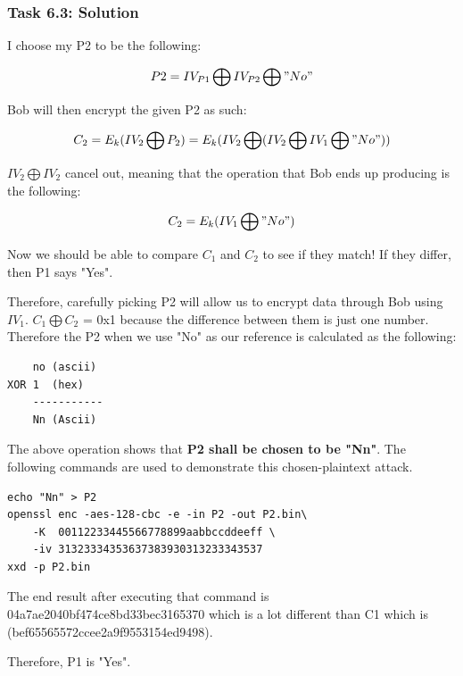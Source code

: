 \documentclass[12pt]{article}
\begin{document}
\clearpage
\subsubsection{Task 6.3: Solution}

I choose my P2 to be the following:

\[ P2 = IV_{P1} \bigoplus IV_{P2} \bigoplus "No" \]

Bob will then encrypt the given P2 as such:

\[ C_2 = E_{k} (IV_2 \bigoplus P_2 ) = E_{k} (IV_2\bigoplus (IV_2\bigoplus IV_1 \bigoplus "No")) \]

$IV_2 \bigoplus IV_2$ cancel out, meaning that the operation that Bob ends up producing is the following:

\[ C_2 = E_k (IV_1 \bigoplus "No") \]

Now we should be able to compare $C_1$ and $C_2$ to see if they match! If they differ, then P1 says "Yes".

Therefore, carefully picking P2 will allow us to encrypt data through Bob using $IV_1$. $C_1 \bigoplus C_2$ = 0x1 because the difference between them is just one number. Therefore the P2 when we use "No" as our reference is calculated as the following:

\begin{verbatim}
    no (ascii)
XOR 1  (hex)
    -----------
    Nn (Ascii)
\end{verbatim}

The above operation shows that \textbf{P2 shall be chosen to be "Nn"}. The following commands are used to demonstrate this chosen-plaintext attack.

\begin{verbatim}
echo "Nn" > P2
openssl enc -aes-128-cbc -e -in P2 -out P2.bin\
    -K  00112233445566778899aabbccddeeff \
    -iv 31323334353637383930313233343537
xxd -p P2.bin

\end{verbatim}

The end result after executing that command is 04a7ae2040bf474ce8bd33bec3165370 which is a lot different than C1 which is (bef65565572ccee2a9f9553154ed9498).

Therefore, P1 is "Yes".
\end{document}
